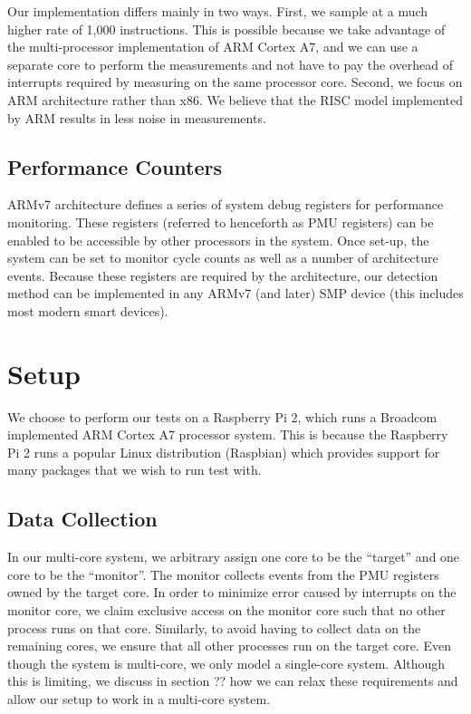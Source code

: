 \documentclass[letterpaper,twocolumn,10pt]{article}
\begin{document}
Our implementation differs mainly in two ways. First, we sample at a much higher rate of 1,000 
instructions. This is possible because we take advantage of the multi-processor 
implementation of ARM Cortex A7, and we can use a separate core to perform the measurements 
and not have to pay the overhead of interrupts required by measuring on the same processor core. 
Second, we focus on ARM architecture rather than x86. We believe that the RISC model 
implemented by ARM results in less noise in measurements.

\subsection*{Performance Counters}

ARMv7 architecture defines a series of system debug registers for performance monitoring\cite{ARMv7}. 
These registers (referred to henceforth as PMU registers) can be enabled to be accessible by other processors in the system. Once set-up, 
the system can be set to monitor cycle counts as well as a number of architecture events. Because these registers 
are required by the architecture, our detection method can be implemented in any ARMv7 (and 
later) SMP device (this includes most modern smart devices).

\section{Setup}

We choose to perform our tests on a Raspberry Pi 2, which runs a Broadcom implemented ARM Cortex A7 processor 
system\cite{RPI}. This is because the Raspberry Pi 2 runs a popular Linux distribution (Raspbian) which 
provides support for many packages that we wish to run test with.

\subsection*{Data Collection}

In our multi-core system, we arbitrary assign one core to be the ``target'' and one core to be the ``monitor''. 
The monitor collects events from the PMU registers owned by the target core. In order 
to minimize error caused by interrupts on the monitor core, we claim exclusive access on the monitor core 
such that no other process runs on that core. Similarly, to avoid having to collect data on the remaining 
cores, we ensure that all other processes run on the target core. Even though the system is multi-core, we 
only model a single-core system. Although this is limiting, we discuss in section ?? how we can relax 
these requirements and allow our setup to work in a multi-core system.
\end{document}
